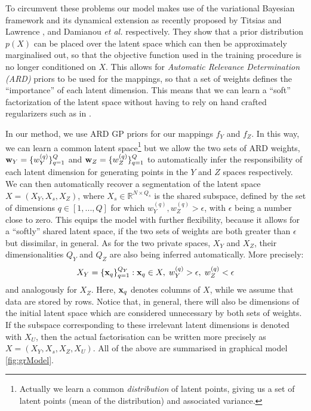 To circumvent these problems our model makes use of the
variational Bayesian framework and its dynamical extension as recently
proposed by Titsias and Lawrence \cite{Titsias:bayesGPLVM10}, and
Damianou \textit{et al.}  \cite{Damianou:vgpds11} respectively.
They show that a prior distribution $p(X)$ can be placed over
the latent space which can then be approximately marginalised out, so
that the objective function used in the training procedure is no
longer conditioned on $X$. This allows for \emph{Automatic Relevance
  Determination (ARD)} priors \cite{Rasmussen:book06} to be used for
the mappings, so that a set of weights defines the ``importance'' of
each latent dimension. This means that we can learn a ``soft''
factorization of the latent space without having to rely on hand crafted
regularizers such as in \cite{Salzmann:2010vh}.

\par In our method, we use ARD GP priors for our
mappings $f_Y$ and $f_Z$. In this way, we can learn a common latent
space\footnote{Actually we learn a common \emph{distribution} of
  latent points, giving us a set of latent points (mean of the
  distribution) and associated variance.} but we allow the two sets of
ARD weights, $\mathbf{w}_Y = \{ w^{(q)}_Y \}_{q=1}^Q$ and $\mathbf{w}_Z = \{
w^{(q)}_Z \}_{q=1}^Q$ to automatically infer the responsibility of
each latent dimension for generating points in the $Y$ and $Z$ spaces
respectively.  We can then automatically recover a segmentation of the
latent space $X = \left( X_Y, X_s, X_Z \right)$, where $X_s \in
\mathbb{R}^{N \times Q_s}$ is the shared subspace, defined by the set
of dimensions $q \in [1, ... ,Q]$ for which $w_Y^{(q)}, w_Z^{(q)} >
\epsilon$, with $\epsilon$ being a number close to zero. This equips
the model with further flexibility, because
it allows for a ``softly'' shared latent space, if the two sets of weights are
both greater than $\epsilon$ but dissimilar, in general.  As for the
two private spaces, $X_Y$ and $X_Z$, their dimensionalities $Q_Y$ and
$Q_Z$ are also being inferred automatically.  More precisely:
\begin{equation}
X_Y = \{ \mathbf{x}_q \}_{q=1}^{Q_Y}: \mathbf{x}_q \in X, \; w_Y^{(q)} > \epsilon, \;  w_Z^{(q)} < \epsilon
\end{equation}
and analogously for $X_Z$. Here, $\mathbf{x}_q$ denotes columns of $X$, while we assume that
data are stored by rows.
 Notice that, in general, there will also be
dimensions of the initial latent space which are considered
unnecessary by both sets of weights. If the subspace corresponding to
these irrelevant latent dimensions is denoted with $X_U$, then the actual factorisation
can be written more precisely as $X = \left( X_Y, X_s, X_Z, X_U
\right)$.  All of the above are summarised in graphical model
\ref{fig:grModel}.

